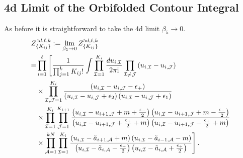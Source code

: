 \documentclass[main.tex]{subfiles}
\begin{document}
\subsection{4d Limit of the Orbifolded Contour Integral}
As before it is straightforward to take the 4d limit $\beta_5\to0$.
\begin{align}
&Z^{4d,\ell,k}_{\{K_{ij}\}}:=\lim_{\beta_5\to0}Z^{5d,\ell,k}_{\{K_{ij}\}}\\
&\begin{aligned}
=&\prod_{i=1}^{\ell}\Bigg[\frac{1}{\prod_{j=1}^kK_{ij}!}\int\prod_{\mathcal{I}=1}^{K_{i}}\frac{du_{i,\mathcal{I}}}{2\pi\mathrm{i}}\prod_{\mathcal{I}\neq \mathcal{J}}\left(u_{i,\mathcal{I}}-u_{i,\mathcal{J}}\right)\\
&\times\prod_{\mathcal{I},\mathcal{J}=1}^{K_{i}}\frac{\left(u_{i,\mathcal{I}}-u_{i,\mathcal{J}}-\epsilon_+\right)}{\left(u_{i,\mathcal{I}}-u_{i,\mathcal{J}}+\epsilon_2\right)\left(u_{i,\mathcal{I}}-u_{i,\mathcal{J}}+\epsilon_1\right)}\\
&\times\prod_{\mathcal{I}=1}^{K_{i}}\prod_{\mathcal{J}=1}^{K_{i+1}}\frac{\left(u_{i,\mathcal{I}}-u_{i+1,\mathcal{J}}+m+\frac{\epsilon_-}{2}\right)\left(u_{i,\mathcal{I}}-u_{i+1,\mathcal{J}}+m-\frac{\epsilon_-}{2}\right)}{\left(u_{i,\mathcal{I}}-u_{i+1,\mathcal{J}}+\frac{\epsilon_+}{2}+m\right)\left(u_{i,\mathcal{I}}-u_{i+1,\mathcal{J}}-\frac{\epsilon_+}{2}+m\right)}\\
&\times\prod_{\mathcal{A}=1}^{kN}\prod_{\mathcal{I}=1}^{K_{i}}\frac{\left(u_{i,\mathcal{I}}-\tilde{a}_{i+1,\mathcal{A}}+m\right)\left(u_{i,\mathcal{I}}-\tilde{a}_{i-1,\mathcal{A}}-m\right)}{\left(u_{i,\mathcal{I}}-\tilde{a}_{i,\mathcal{A}}-\frac{\epsilon_+}{2}\right)\left(u_{i,\mathcal{I}}-\tilde{a}_{i,\mathcal{A}}+\frac{\epsilon_+}{2}\right)}\Bigg]\,.
\end{aligned}
\end{align}
\end{document}
